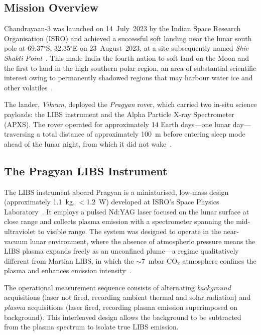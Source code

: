 \documentclass[a4paper,twocolumn,10pt]{article}
\begin{document}
\subsection{Mission Overview}

Chandrayaan-3 was launched on 14~July~2023 by the Indian Space Research
Organisation (ISRO) and achieved a successful soft landing near the
lunar south pole at 69.37$^\circ$S, 32.35$^\circ$E on 23~August~2023,
at a site subsequently named \emph{Shiv Shakti Point}~\cite{ISROCh3}.
This made India the fourth nation to soft-land on the Moon and the
first to land in the high southern polar region, an area of
substantial scientific interest owing to permanently shadowed regions
that may harbour water ice and other volatiles~\cite{Colaprete2010,
Li2018}.

The lander, \emph{Vikram}, deployed the \emph{Pragyan} rover, which
carried two in-situ science payloads: the LIBS instrument and the
Alpha Particle X-ray Spectrometer (APXS).  The rover operated for
approximately 14 Earth days---one lunar day---traversing a total
distance of approximately 100~m before entering sleep mode ahead of
the lunar night, from which it did not wake~\cite{Saeidfirozeh2024}.

\subsection{The Pragyan LIBS Instrument}

The LIBS instrument aboard Pragyan is a miniaturised, low-mass design
(approximately 1.1~kg, $<$1.2~W) developed at ISRO's Space Physics
Laboratory~\cite{Laxmiprasad2020}.  It employs a pulsed Nd:YAG laser
focused on the lunar surface at close range and collects plasma
emission with a spectrometer spanning the mid-ultraviolet to visible
range.  The system was designed to operate in the near-vacuum lunar
environment, where the absence of atmospheric pressure means the LIBS
plasma expands freely as an unconfined plume---a regime qualitatively
different from Martian LIBS, in which the $\sim$7~mbar CO$_2$
atmosphere confines the plasma and enhances emission
intensity~\cite{Knight2000,Saeidfirozeh2024}.

The operational measurement sequence consists of alternating
\emph{background} acquisitions (laser not fired, recording ambient
thermal and solar radiation) and \emph{plasma} acquisitions (laser
fired, recording plasma emission superimposed on background).  This
interleaved design allows the background to be subtracted from the
plasma spectrum to isolate true LIBS emission.
\end{document}
